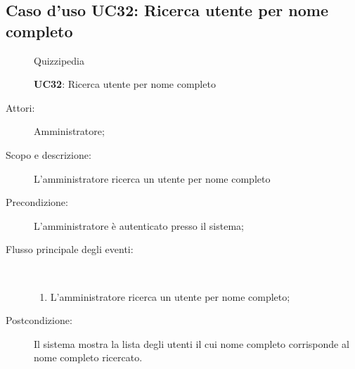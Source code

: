\subsection{Caso d'uso UC32: Ricerca utente per nome completo}
	\begin{figure}[H]
		\centering
		\begin{resizedtikzpicture}{\textwidth}
		\begin{umlsystem}[x=0, fill=lightgray!20]{Quizzipedia}
		\end{umlsystem}
		\end{resizedtikzpicture}
		\caption{\textbf{UC32}: Ricerca utente per nome completo}
		\label{UC32}
	\end{figure}
\begin{description}
\item[Attori:] Amministratore;
\item[Scopo e descrizione:] L'amministratore ricerca un utente per nome completo
      \item[Precondizione:] L'amministratore è autenticato presso il sistema;

        \item[Flusso principale degli eventi:] \ 
 \begin{enumerate}
          \item L'amministratore ricerca un utente per nome completo;

      \end{enumerate}
    \item[Postcondizione:] Il sistema mostra la lista degli utenti il cui nome completo corrisponde al nome completo ricercato.
  \end{description}
\hypertarget{UC33}{}
